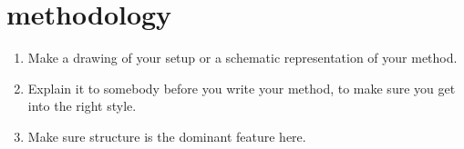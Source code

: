 \section{methodology}

\begin{enumerate}
    \item Make a drawing of your setup or a schematic representation of your method.
    \item Explain it to somebody before you write your method, to make sure you get into the right
          style.
    \item Make sure structure is the dominant feature here.
\end{enumerate}